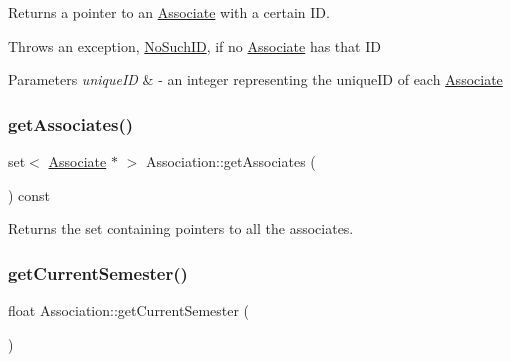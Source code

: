 Returns a pointer to an \mbox{\hyperlink{classAssociate}{Associate}} with a certain ID. 

Throws an exception, \mbox{\hyperlink{classNoSuchID}{No\+Such\+ID}}, if no \mbox{\hyperlink{classAssociate}{Associate}} has that ID


\begin{DoxyParams}{Parameters}
{\em unique\+ID} & -\/ an integer representing the unique\+ID of each \mbox{\hyperlink{classAssociate}{Associate}} \\
\hline
\end{DoxyParams}
\mbox{\label{classAssociation_a7ef9441d3b0a176012f393453344fdf1}} 
\subsubsection{\texorpdfstring{get\+Associates()}{getAssociates()}}
{\footnotesize\ttfamily set$<$ \mbox{\hyperlink{classAssociate}{Associate}} $\ast$ $>$ Association\+::get\+Associates (\begin{DoxyParamCaption}{ }\end{DoxyParamCaption}) const}



Returns the set containing pointers to all the associates. 

\mbox{\label{classAssociation_a6d31c13ec77d54a1e814ae9528af694a}} 
\subsubsection{\texorpdfstring{get\+Current\+Semester()}{getCurrentSemester()}}
{\footnotesize\ttfamily float Association\+::get\+Current\+Semester (\begin{DoxyParamCaption}{ }\end{DoxyParamCaption})\hspace{0.3cm}{\ttfamily [static]}}

\mbox{\label{classAssociation_a92f8779f17716e9dcd206f63f888403c}} 
